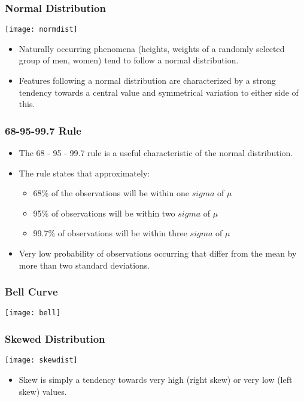 \begin{frame}[fragile] \frametitle{Normal Distribution}
\begin{center}
\texttt{[image: normdist]}
\end{center}
\begin{itemize}
\item Naturally occurring phenomena (heights, weights of a randomly selected group of men, women) tend to follow a normal distribution.
\item Features following a normal distribution are characterized by a strong tendency towards a central value and symmetrical variation to either side of this. 
\end{itemize}
\end{frame}


\begin{frame}[fragile] \frametitle{68-95-99.7 Rule}
\begin{itemize}
\item The 68 - 95 - 99.7 rule is a useful characteristic of the normal distribution.
\item The rule states that approximately: 
	\begin{itemize}
	\item 68\% of the observations will be within one $sigma$ of $\mu$ 
	\item 95\% of observations will be within two $sigma$ of $\mu$
	\item 99.7\% of observations will be within three $sigma$ of $\mu$
	\end{itemize}
\item Very low probability of observations occurring that differ from the mean by more than two standard deviations.
\end{itemize}
\end{frame}

\begin{frame}[fragile] \frametitle{Bell Curve}
\begin{center}
\texttt{[image: bell]}
\end{center}
\end{frame}

\begin{frame}[fragile] \frametitle{Skewed Distribution}
\begin{center}
\texttt{[image: skewdist]}
\end{center}
\begin{itemize}
\item Skew is simply a tendency towards very high (right skew) or very low (left skew) values. 
\end{itemize}

\end{frame}

